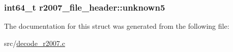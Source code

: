 \hypertarget{structr2007__file__header_aa2be13496a9a88fcbcaeb76b030114f5}{
\subsubsection[{unknown5}]{\setlength{\rightskip}{0pt plus 5cm}int64\-\_\-t {\bf r2007\-\_\-file\-\_\-header\-::unknown5}}}\label{structr2007__file__header_aa2be13496a9a88fcbcaeb76b030114f5}


\-The documentation for this struct was generated from the following file\-:\begin{DoxyCompactItemize}
\item 
src/\hyperlink{decode__r2007_8c}{decode\-\_\-r2007.\-c}\end{DoxyCompactItemize}
